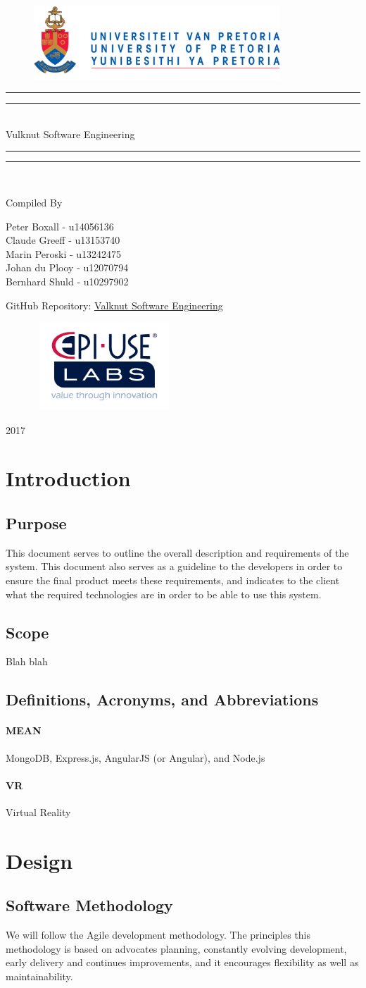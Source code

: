 \documentclass{article}
\newcommand*{\titleGP}{\begingroup
		\begin{figure}[t]
			\centering
			\includegraphics[width=350px]{UP_Logo.PNG}
		\end{figure}		
\centering 
\vspace*{\baselineskip}

\rule{\textwidth}{1.6pt}\vspace*{-\baselineskip}\vspace*{2pt}
\rule{\textwidth}{0.4pt}\\[\baselineskip]

{\Huge Vulknut Software Engineering } \\ [0.2\baselineskip]
\rule{\textwidth}{0.4pt}\vspace*{-\baselineskip}\vspace{3.2pt}
\rule{\textwidth}{1.6pt}\\[\baselineskip] %



\bigskip

Compiled By \\[\baselineskip]

\bigskip

{\Large Peter Boxall - u14056136 \\ Claude Greeff - u13153740 \\ Marin Peroski -  u13242475 \\ Johan du Plooy - u12070794 \\ Bernhard Shuld - u10297902 \\\par}

\bigskip
\bigskip
\bigskip
 
 	{\huge GitHub Repository:  
 	\href{https://github.com/Valknut-Software-Engineering/Capstone_Project}{Valknut Software Engineering}\par}
 		 	
\bigskip
\bigskip
\bigskip

	\begin{figure}[H]
			\centering
			\includegraphics[width=200px,height=125px]{epiUse.PNG}
	\end{figure}
	
\vfill

{\Large 2017} \\[0.3\baselineskip]

\endgroup}
\begin{document}
\titleGP
\newpage
\tableofcontents
\newpage

\section{Introduction}

	\subsection{Purpose}
	This document serves to outline the overall description and requirements of 	the system. This document also serves as a guideline to the developers in 		order to ensure the final product meets these requirements, and indicates 		to the client what the required technologies are in order to be able to use 	this system.
	
	\subsection{Scope}
	
	Blah blah	
	
	\subsection{Definitions, Acronyms, and Abbreviations}
			\paragraph{MEAN}	MongoDB, Express.js, AngularJS (or Angular), and Node.js
			\paragraph{VR}	Virtual Reality

\section{Design}

	\subsection{Software Methodology}
	We will follow the Agile development methodology. The principles this methodology is based on advocates planning, constantly evolving development, early delivery and continues improvements, and it encourages flexibility as well as maintainability.
	
\end{document}
